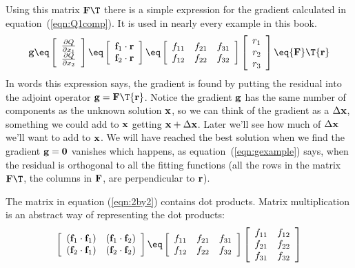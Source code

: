 Using this matrix ${\bold F\T}$ there is a simple expression
for the gradient calculated in equation~(\ref{eqn:Q1comp}).
It is used in nearly every example in this book.
%
\begin{equation}
\bold g \eq 
\left[
\begin{array}{c}
\frac{\partial Q}{\partial x_1} \\
\frac{\partial Q}{\partial x_2}
\end{array}
\right]
\eq
\left[
\begin{array}{c}
{\bf f}_1 \cdot {\bf r} \\
{\bf f}_2 \cdot {\bf r}
\end{array}
\right]
\eq
\left[ 
\begin{array}{ccc}
  f_{11} & f_{21}  & f_{31} \\
  f_{12} & f_{22}  & f_{32}
 \end{array} \right] 
\left[
\begin{array}{c}
r_1 \\
r_2 \\
r_3
\end{array}
\right]
\eq
{\bf F}\T {\bf r}
\label{eqn:gexample}
\end{equation}
%
In words this expression says, the gradient is found by putting the residual into the adjoint operator ${\bf g} = {\bf F}\T {\bf r}$. Notice the gradient ${\bf g}$ has the same number of components as the unknown solution ${\bf x}$, so we can think of the gradient as a $\Delta {\bf x}$, something we could add to ${\bf x}$ getting ${\bf x}  + \Delta {\bf x}$.  Later we'll see how much of $\Delta {\bf x}$ we'll want to add to ${\bf x}$.  We will have reached the best solution when we find the gradient ${\bf g} = {\bf 0}$ vanishes which happens, as equation~(\ref{eqn:gexample}) says, when the residual is orthogonal to all the fitting functions (all the rows in the matrix ${\bf F}\T$, the columns in ${\bf F}$, are perpendicular  to ${\bf r}$). 
\par
The matrix in equation (\ref{eqn:2by2})
contains dot products.
Matrix multiplication is an abstract way of representing the dot products:
\begin{equation}
\left[ 
\begin{array}{ccc}
  (\ff_1 \cdot \ff_1) & (\ff_1 \cdot \ff_2)  \\
  (\ff_2 \cdot \ff_1) & (\ff_2 \cdot \ff_2)  \end{array} \right] 
 \eq
\left[ 
\begin{array}{ccc}
  f_{11} & f_{21} & f_{31}  \\
  f_{12} & f_{22} & f_{32}  \end{array} \right] 
\left[ 
\begin{array}{ccc}
  f_{11} & f_{12}  \\
  f_{21} & f_{22}  \\
  f_{31} & f_{32}  \end{array} \right] 
\label{eqn:covmat}
\end{equation}
